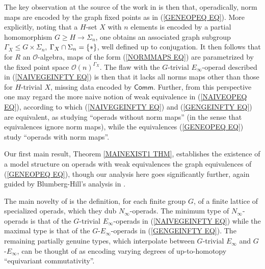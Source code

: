 \documentclass[a4paper,10pt]{article}%
\begin{document}
The key observation at the source of the work in 
\cite{BH15} is then that, operadically, 
norm maps are encoded by the graph fixed points as in (\ref{GENEOPEQ EQ}).
More explicitly, noting that a $H$-set $X$ with $n$ elements 
is encoded by a partial homomorphism 
$G \geq H \to \Sigma_n$, 
one obtains an associated graph subgroup 
$\Gamma_X \leq G \times \Sigma_n$, 
$\Gamma_X \cap \Sigma_n =\{\**\}$, well defined up to conjugation. It then follows that for $R$ an 
$\mathcal{O}$-algebra, maps of the form (\ref{NORMMAPS EQ})
are parametrized by the fixed point space
$\mathcal{O}(n)^{\Gamma_X}$.
The flaw with the $G$-trivial $E_{\infty}$-operad
described in (\ref{NAIVEGEINFTY EQ}) is then that it lacks all norms maps other than those for $H$-trivial $X$, missing data encoded by $\mathsf{Comm}$.
Further, from this perspective one may regard the more naive notion of weak equivalence in (\ref{NAIVEOPEQ EQ}),
according to which (\ref{NAIVEGEINFTY EQ}) and (\ref{GENGEINFTY EQ}) are equivalent,
as studying ``operads without norm maps''
(in the sense that equivalences ignore norm maps), 
while the equivalences (\ref{GENEOPEQ EQ})
study ``operads with norm maps''.

Our first main result, Theorem \ref{MAINEXIST1 THM}, 
establishes the existence of a model structure on operads with weak equivalences the graph equivalences of (\ref{GENEOPEQ EQ}),
though our analysis here goes significantly further, again guided by Blumberg-Hill's analysis in \cite{BH15}.

The main novelty of \cite{BH15} is the definition, for each finite group $G$, of a finite lattice of specialized operads, which they dub $N_{\infty}$-operads.
The minimum type of $N_{\infty}$-operads is that of the 
$G$-trivial $E_{\infty}$-operads in (\ref{NAIVEGEINFTY EQ}) 
while the maximal type is that of the $G$-$E_{\infty}$-operads in (\ref{GENGEINFTY EQ}).
The remaining partially genuine types, which interpolate between 
$G$-trivial $E_{\infty}$ and $G$-$E_{\infty}$, 
can be thought of as encoding varying degrees of up-to-homotopy ``equivariant commutativity''.
\end{document}
